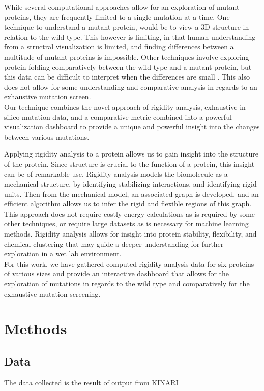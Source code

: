 \documentclass[10pt]{IEEEtran}
\begin{document}
While several computational approaches allow for an exploration of mutant proteins, they are frequently limited to a single mutation at a time.  One technique to understand a mutant protein, would be to view a 3D structure in relation to the wild type. This however is limiting, in that human understanding from a structral visualization is limited, and finding differences between a multitude of mutant proteins is impossible. Other techniques involve exploring protein folding comparatively between the wild type and a mutant protein, but this data can be difficult to interpret when the differences are small \cite{b4}. This also does not allow for some understanding and comparative analysis in regards to an exhaustive mutation screen.\\ Our technique combines the novel approach of rigidity analysis, exhaustive in-silico mutation data, and a comparative metric combined into a powerful visualization dashboard to provide a unique and powerful insight into the changes between various mutations.

Applying rigidity analysis to a protein allows us to gain insight into the structure of the protein. Since structure is crucial to the function of a protein, this insight can be of remarkable use. Rigidity analysis models the biomolecule as a mechanical structure, by identifying stabilizing interactions, and identifying rigid units. Then from the mechanical model, an associated graph is developed, and an efficient algorithm allows us to infer the rigid and flexible regions of this graph. This approach does not require costly energy calculations as is required by some other techniques, or require large datasets as is necessary for machine learning methods. Rigidity analysis allows for insight into protein stability, flexibility, and chemical clustering that may guide a deeper understanding for further exploration in a wet lab environment.\\

For this work, we have gathered computed rigidity analysis data for six proteins of various sizes and provide an interactive dashboard that allows for the exploration of mutations in regards to the wild type and comparatively for the exhaustive mutation screening.



\section{Methods}
\subsection{Data}\label{AA}
The data collected is the result of output from KINARI \cite{b1}
\end{document}

